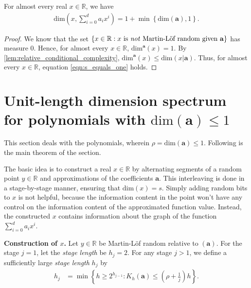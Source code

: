 \documentclass[a4paper,UKenglish,cleveref,autoref,thm-restate]{lipics-v2021}
\newcommand{\R}{\mathbb{R}}
\renewcommand{\dim}{{\mathrm{dim}}}
\begin{document}
\begin{corollary}
For almost every real $x \in \R$, we have 
\begin{align}
  \label{eqn:s_equals_one}
  \dim\left(x,\sum_{i=0}^da_ix^i\right)=1+\min\left\{\dim{(\mathbf{a}),1}\right\}.   
\end{align}
\end{corollary}
\begin{proof}
  We know that the set
  $\{x\in\mathbb{R}:x\text{ is \emph{not} Martin-L\"of random given
    $\mathbf{a}$}\}$ has measure 0. Hence, for almost every $x\in\R$,
  $\dim^\mathbf{a}(x)=1$. By
  \cref{lem:relative_conditional_complexity},
  $\dim^\mathbf{a}(x)\leq\dim(x|\mathbf{a})$. Thus, for almost every
  $x\in\R$, equation \ref{eqn:s_equals_one} holds.
\end{proof}






\section{Unit-length dimension spectrum for polynomials with
  $\dim(\mathbf{a})\leq1$}\label{sec:lo} 
This section deals with the polynomials, wherein
$\rho=\dim(\mathbf{a})\leq1$. Following is the main theorem of the section.

\maintheoremlow*%

The basic idea is to construct a real $x\in\mathbb{R}$ by alternating
segments of a random point $y\in\mathbb{R}$ and approximations of the
coefficients $\mathbf{a}$. This interleaving is done in a
stage-by-stage manner, ensuring that $\dim(x)=s$. Simply adding random
bits to $x$ is not helpful, because the information content in the
point won't have any control on the information content of the
approximated function value. Instead, the constructed $x$ contains
information about the graph of the function $\sum_{i=0}^{d}a_ix^i$.

\textbf{Construction of $x$.} Let $y\in\mathbb{R}$ be Martin-L\"of random relative to $(\mathbf{a})$. For the stage $j=1$, let the \emph{stage length} be $h_j=2$. For any stage $j>1$, we define a sufficiently large \emph{stage length} $h_j$ by 
\begin{align}\label{eqn:stage_length}
	h_j&=\min\left\{h\ge2^{h_{j-1}}:K_h(\mathbf{a})\le\left(\rho+\frac{1}{j}\right)h\right\}.
\end{align}
\end{document}

